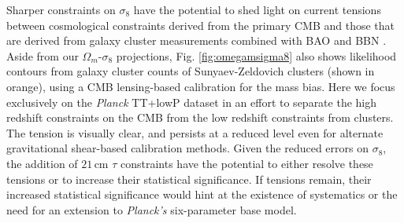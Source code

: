 \documentclass[twocolumn,aps,prd,nofootinbib,showpacs]{revtex4-1}
\begin{document}
Sharper constraints on $\sigma_8$ have the potential to shed light on current tensions between cosmological constraints derived from the primary CMB and those that are derived from galaxy cluster measurements combined with BAO and BBN \cite{Planck2015clusters}. Aside from our $\Omega_m$-$\sigma_8$ projections, Fig. \ref{fig:omegamsigma8} also shows likelihood contours from galaxy cluster counts of Sunyaev-Zeldovich clusters (shown in orange), using a CMB lensing-based calibration for the mass bias. Here we focus exclusively on the \emph{Planck} TT+lowP dataset in an effort to separate the high redshift constraints on the CMB from the low redshift constraints from clusters. The tension is visually clear, and persists at a reduced level even for alternate gravitational shear-based calibration methods. Given the reduced errors on $\sigma_8$, the addition of $21\,\textrm{cm}$ $\tau$ constraints have the potential to either resolve these tensions or to increase their statistical significance. If tensions remain, their increased statistical significance would hint at the existence of systematics or the need for an extension to \emph{Planck's} six-parameter base model.
\end{document}

